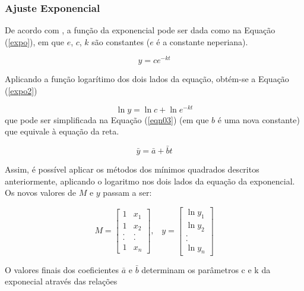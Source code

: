 {	\subsubsection{Ajuste Exponencial}

	De acordo com \cite{calculo}, a função da exponencial pode ser dada como na Equação (\ref{expo}), em que $e$, $c$, $k$ são constantes ($e$ é a constante neperiana).  

	\begin{equation}
	\label{expo}
		y = ce^{-kt}
	\end{equation}

	Aplicando a função logarítimo dos dois lados da equação, obtém-se a  Equação (\ref{expo2})

	\begin{equation}
	\label{expo2}
		\ln{y} = \ln{c}  + \ln{e^{-kt}}
	\end{equation}
 	que pode ser simplificada na  Equação (\ref{eqn03}) (em que $b$ é uma nova constante) que equivale à equação da reta. 

	\begin{equation}
	\label{eqn03}
		\bar{y} = \bar{a} + \bar{b}t
	\end{equation}	

	Assim, é possível aplicar os métodos dos mínimos quadrados descritos anteriormente, aplicando o logaritmo nos dois lados da equação da exponencial. Os novos valores de $M$ e $y$ passam a ser: 

	\begin{equation}
	M = \left[\begin{array}{cc}
               	1 &  x_{1} \\
               	1 & x_{2}  \\
		. & .  \\
               	. & .  \\
		1 & x_{n}
          	         \end{array}\right] \mbox{,} \quad
	y = \left[\begin{array}{c}
               	\ln{y_{1}} \\
               	\ln{y_{2}}  \\
		.   \\
               	.   \\
		\ln{y_{n}}
          	         \end{array}\right] 
	\label{nvar}
	\end{equation}

	O valores finais dos coeficientes $\bar{a}$ e $\bar{b}$ determinam os parâmetros c e k da exponecial através das relações

}
